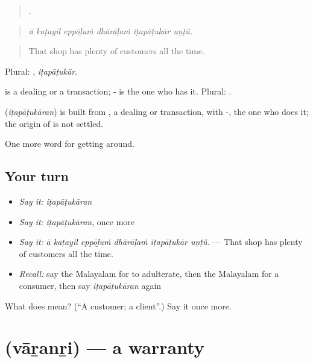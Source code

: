 \begin{quote}
     .
\end{quote}

\begin{quote}
\emph{ā kaṭayil eppōḻuṁ dhārāḷaṁ iṭapāṭukār uṇṭŭ.}
\end{quote}

\begin{quote}
That shop has plenty of customers all the time.
\end{quote}

Plural: , \emph{iṭapāṭukār}.

 is a dealing or a transaction; - is the one who has it. Plural: .

\begin{cousinweb}
\textbf{} (\emph{iṭapāṭukāran}) is built from , a dealing or transaction, with -, the one who does it; the origin of  is not settled.
\end{cousinweb}

\begin{grammarlens}[title={What you've built}]
One more word for getting around.
\end{grammarlens}

\subsection*{Your turn}
\begin{itemize}
\raggedright
  \item \emph{Say it:} \emph{iṭapāṭukāran}
  \item \emph{Say it:} \emph{iṭapāṭukāran}, once more
  \item \emph{Say it:} \emph{ā kaṭayil eppōḻuṁ dhārāḷaṁ iṭapāṭukār uṇṭŭ.} — That shop has plenty of customers all the time.
  \item \emph{Recall:} say the Malayalam for to adulterate, then the Malayalam for a consumer, then say \emph{iṭapāṭukāran} again
\end{itemize}

\begin{tcolorbox}[breakable,colback=teal!4,colframe=teal!35!black,title={Before you move on}]
What does  mean? (\textquotedblleft{}A customer; a client\textquotedblright{}.) Say it once more.
\end{tcolorbox}
\section[\texorpdfstring{\ml{വാറന്റി} (vāṟanṟi)}{വാറന്റി (vāṟanṟi)}]{ (vāṟanṟi) — a warranty}

